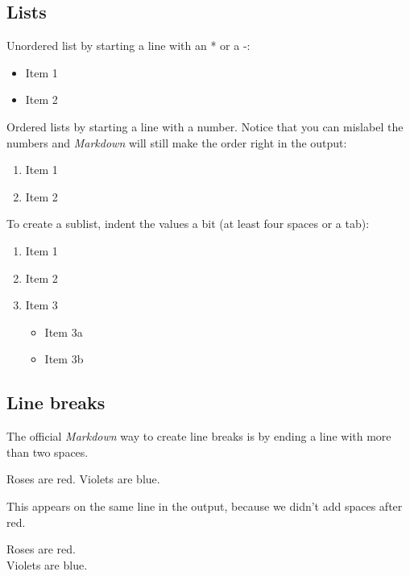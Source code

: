 \documentclass[a4paper, nobind]{templates/ociamthesis}
\providecommand{\tightlist}{%
  \setlength{\itemsep}{0pt}\setlength{\parskip}{0pt}}
\begin{document}
\hypertarget{lists}{%
\subsection{Lists}\label{lists}}

Unordered list by starting a line with an * or a -:

\begin{itemize}
\tightlist
\item
  Item 1
\item
  Item 2
\end{itemize}

Ordered lists by starting a line with a number.
Notice that you can mislabel the numbers and \emph{Markdown} will still make the order right in the output:

\begin{enumerate}
\def\labelenumi{\arabic{enumi}.}
\tightlist
\item
  Item 1
\item
  Item 2
\end{enumerate}

To create a sublist, indent the values a bit (at least four spaces or a tab):

\begin{enumerate}
\def\labelenumi{\arabic{enumi}.}
\tightlist
\item
  Item 1
\item
  Item 2
\item
  Item 3

  \begin{itemize}
  \tightlist
  \item
    Item 3a
  \item
    Item 3b
  \end{itemize}
\end{enumerate}

\hypertarget{line-breaks}{%
\subsection{Line breaks}\label{line-breaks}}

The official \emph{Markdown} way to create line breaks is by ending a line with more than two spaces.

Roses are red.
Violets are blue.

This appears on the same line in the output, because we didn't add spaces after red.

Roses are red.\\
Violets are blue.
\end{document}
